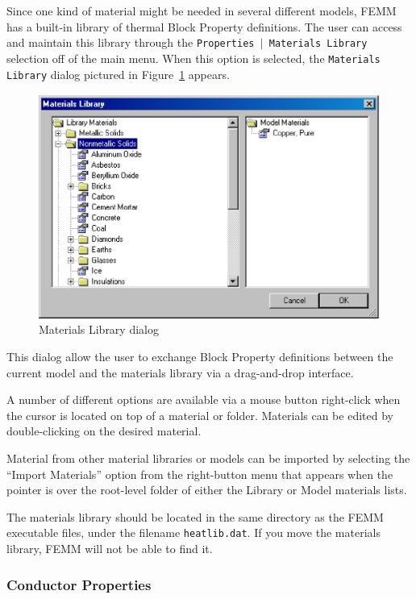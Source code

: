 Since one kind of material might be needed in several different
models, FEMM has a built-in library of thermal Block Property definitions.
The user can access and maintain this library through the
\texttt{Properties $\vert $ Materials Library} selection off of the
main menu. When this option is selected, the
\texttt{Materials Library} dialog pictured in Figure~\ref{hfig11} appears.

\begin{figure}[htbp]
\centerline{\includegraphics{hmatlib.ps}}
\caption{Materials Library dialog}
\label{hfig11}
\end{figure}

This dialog allow the user to exchange Block
Property definitions between the current model and the materials
library via a drag-and-drop interface.

A number of different options are available via a mouse button right-click
when the cursor is located on top of a material or folder. Materials can be edited
by double-clicking on the desired material.

Material from other material libraries or models can be imported by selecting the
``Import Materials'' option from the right-button menu that appears when the pointer
is over the root-level folder of either the Library or Model materials lists.

The materials library should be located in the same directory as
the FEMM executable files, under the filename \texttt{heatlib.dat}.
If you move the materials library, FEMM will not be able to find
it.

\subsubsection{Conductor Properties}

